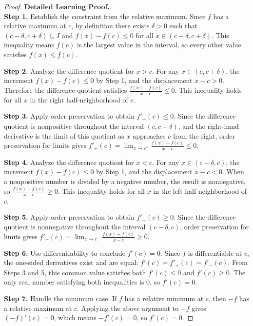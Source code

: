 \begin{proof}
\textbf{Detailed Learning Proof.}~\\

\textbf{Step 1.} Establish the constraint from the relative maximum. Since $f$ has a relative maximum at $c$, by definition there exists $\delta > 0$ such that $(c - \delta, c + \delta) \subseteq I$ and $f(x) - f(c) \leq 0$ for all $x \in (c - \delta, c + \delta)$. This inequality means $f(c)$ is the largest value in the interval, so every other value satisfies $f(x) \leq f(c)$.

\textbf{Step 2.} Analyze the difference quotient for $x > c$. For any $x \in (c, c + \delta)$, the increment $f(x) - f(c) \leq 0$ by Step 1, and the displacement $x - c > 0$. Therefore the difference quotient satisfies $\frac{f(x) - f(c)}{x - c} \leq 0$. This inequality holds for all $x$ in the right half-neighborhood of $c$.

\textbf{Step 3.} Apply order preservation to obtain $f'_+(c) \leq 0$. Since the difference quotient is nonpositive throughout the interval $(c, c + \delta)$, and the right-hand derivative is the limit of this quotient as $x$ approaches $c$ from the right, order preservation for limits gives $f'_+(c) = \lim_{x \to c^+} \frac{f(x) - f(c)}{x - c} \leq 0$.

\textbf{Step 4.} Analyze the difference quotient for $x < c$. For any $x \in (c - \delta, c)$, the increment $f(x) - f(c) \leq 0$ by Step 1, and the displacement $x - c < 0$. When a nonpositive number is divided by a negative number, the result is nonnegative, so $\frac{f(x) - f(c)}{x - c} \geq 0$. This inequality holds for all $x$ in the left half-neighborhood of $c$.

\textbf{Step 5.} Apply order preservation to obtain $f'_-(c) \geq 0$. Since the difference quotient is nonnegative throughout the interval $(c - \delta, c)$, order preservation for limits gives $f'_-(c) = \lim_{x \to c^-} \frac{f(x) - f(c)}{x - c} \geq 0$.

\textbf{Step 6.} Use differentiability to conclude $f'(c) = 0$. Since $f$ is differentiable at $c$, the one-sided derivatives exist and are equal: $f'(c) = f'_+(c) = f'_-(c)$. From Steps 3 and 5, this common value satisfies both $f'(c) \leq 0$ and $f'(c) \geq 0$. The only real number satisfying both inequalities is $0$, so $f'(c) = 0$.

\textbf{Step 7.} Handle the minimum case. If $f$ has a relative minimum at $c$, then $-f$ has a relative maximum at $c$. Applying the above argument to $-f$ gives $(-f)'(c) = 0$, which means $-f'(c) = 0$, so $f'(c) = 0$.
\end{proof}

